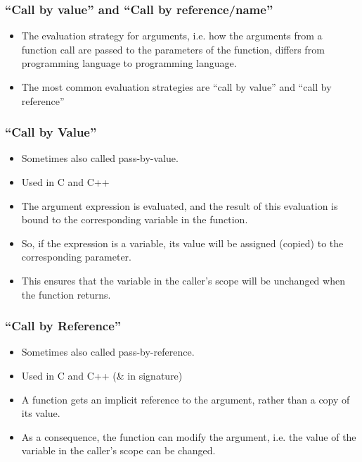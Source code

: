 \begin{frame}[fragile]\frametitle{``Call by value'' and ``Call by reference/name''}
    \begin{itemize}
    \item The evaluation strategy for arguments, i.e. how the arguments from a function call are passed to the parameters of the function, differs from programming language to programming language.
    \item The most common evaluation strategies are ``call by value'' and ``call by reference''
            \end{itemize}
\end{frame}

\begin{frame}[fragile]\frametitle{``Call by Value'' }
    \begin{itemize}
    \item Sometimes also called pass-by-value.
    \item Used in C and C++
    \item The argument expression is evaluated, and the result of this evaluation is bound to the corresponding variable in the function. 
    \item So, if the expression is a variable, its value will be assigned (copied) to the corresponding parameter. 
    \item This ensures that the variable in the caller's scope will be unchanged when the function returns. 
            \end{itemize}
\end{frame}

\begin{frame}[fragile]\frametitle{``Call by Reference'' }
    \begin{itemize}
    \item Sometimes also called pass-by-reference.
    \item  Used in C and C++ (\& in signature)
    \item A function gets an implicit reference to the argument, rather than a copy of its value. 
    \item As a consequence, the function can modify the argument, i.e. the value of the variable in the caller's scope can be changed.
            \end{itemize}
\end{frame}



